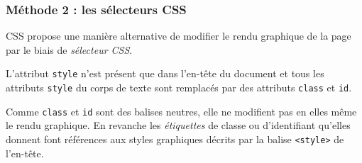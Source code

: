 \documentclass[a4paper,17pt]{extarticle}
\begin{document}
    \hypertarget{muxe9thode-2-les-suxe9lecteurs-css}{%
\subsubsection{Méthode 2 : les sélecteurs
CSS}\label{muxe9thode-2-les-suxe9lecteurs-css}}

    CSS propose une manière alternative de modifier le rendu graphique de la
page par le biais de \emph{sélecteur CSS}.

L'attribut \texttt{style} n'est présent que dans l'en-tête du document
et tous les attributs \texttt{style} du corps de texte sont remplacés
par des attributs \texttt{class} et \texttt{id}.

Comme \texttt{class} et \texttt{id} sont des balises neutres, elle ne
modifient pas en elles même le rendu graphique. En revanche les
\emph{étiquettes} de classe ou d'identifiant qu'elles donnent font
références aux styles graphiques décrits par la balise
\texttt{\textless{}style\textgreater{}} de l'en-tête.
\end{document}
